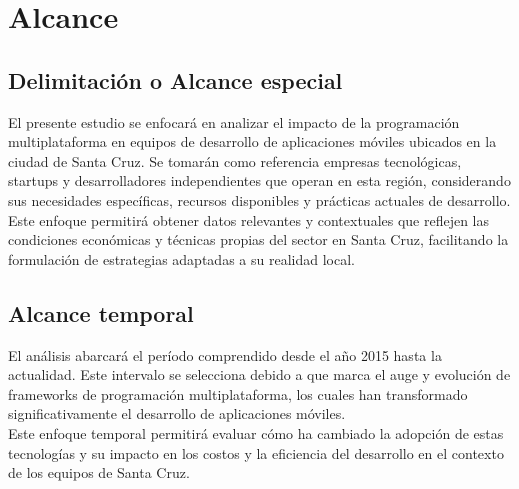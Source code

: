 \newpage
\section{Alcance}

\subsection{Delimitación o Alcance especial}
El presente estudio se enfocará en analizar el impacto de la programación
multiplataforma en equipos de desarrollo de aplicaciones móviles ubicados
en la ciudad de Santa Cruz. Se tomarán como referencia empresas tecnológicas,
startups y desarrolladores independientes que operan en esta región,
considerando sus necesidades específicas, recursos disponibles y prácticas
actuales de desarrollo.\\

Este enfoque permitirá obtener datos relevantes
y contextuales que reflejen las condiciones económicas y técnicas propias
del sector en Santa Cruz, facilitando la formulación de estrategias
adaptadas a su realidad local.

\subsection{Alcance temporal}
El análisis abarcará el período comprendido desde el año 2015 hasta la
actualidad. Este intervalo se selecciona debido a que marca el auge y
evolución de frameworks de programación multiplataforma, los cuales
han transformado significativamente el desarrollo de aplicaciones móviles.\\

Este enfoque temporal permitirá evaluar cómo ha cambiado la adopción de
estas tecnologías y su impacto en los costos y la eficiencia del
desarrollo en el contexto de los equipos de Santa Cruz.

